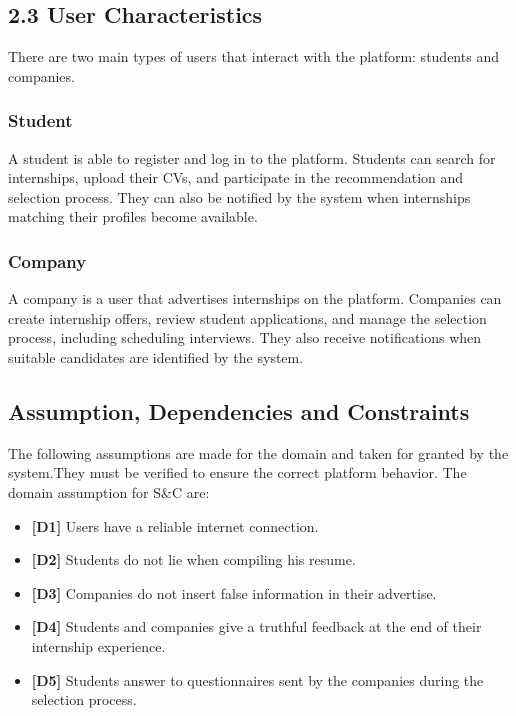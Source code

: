 \documentclass[12pt]{article}
\numberwithin{figure}{section}
\numberwithin{table}{section}
\begin{document}
\newpage

\subsection{2.3 User Characteristics}

There are two main types of users that interact with the platform: students and companies.

\subsubsection{Student}
A student is able to register and log in to the platform. Students can search for internships, upload their CVs, and participate in the recommendation and selection process. They can also be notified by the system when internships matching their profiles become available.

\subsubsection{Company}
A company is a user that advertises internships on the platform. Companies can create internship offers, review student applications, and manage the selection process, including scheduling interviews. They also receive notifications when suitable candidates are identified by the system.

\subsection{Assumption, Dependencies and Constraints}
    The following assumptions are made for the domain and taken for granted by the system.They must be verified to ensure the correct platform behavior.
    The domain assumption for S\&C are:
    \begin{itemize}
        \item \textbf{[D1]} Users have a reliable internet connection.
        \item \textbf{[D2]} Students do not lie when compiling his resume.
        \item \textbf{[D3]} Companies do not insert false information in their advertise.
        \item \textbf{[D4]} Students and companies give a truthful feedback at the end of their internship experience.
        \item \textbf{[D5]} Students answer to questionnaires sent by the companies during the selection process.
    \end{itemize}
    
\end{document}

